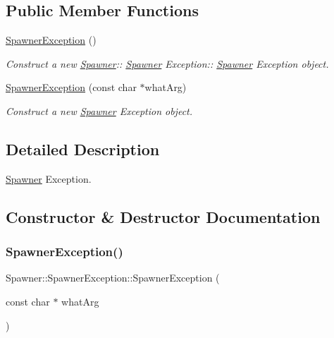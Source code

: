 \subsection*{Public Member Functions}
\begin{DoxyCompactItemize}
\item 
\mbox{\label{class_spawner_1_1_spawner_exception_ae316f8e634adf86867c287e80e40b853}} 
\hyperlink{class_spawner_1_1_spawner_exception_ae316f8e634adf86867c287e80e40b853}{Spawner\+Exception} ()
\begin{DoxyCompactList}\small\item\em Construct a new \hyperlink{class_spawner}{Spawner}\+:\+: \hyperlink{class_spawner}{Spawner} Exception\+:\+: \hyperlink{class_spawner}{Spawner} Exception object. \end{DoxyCompactList}\item 
\hyperlink{class_spawner_1_1_spawner_exception_a2d05238390949da15668a4ef373fc9b2}{Spawner\+Exception} (const char $\ast$what\+Arg)
\begin{DoxyCompactList}\small\item\em Construct a new \hyperlink{class_spawner}{Spawner} Exception object. \end{DoxyCompactList}\end{DoxyCompactItemize}


\subsection{Detailed Description}
\hyperlink{class_spawner}{Spawner} Exception. 

\subsection{Constructor \& Destructor Documentation}
\mbox{\label{class_spawner_1_1_spawner_exception_a2d05238390949da15668a4ef373fc9b2}} 
\subsubsection{\texorpdfstring{Spawner\+Exception()}{SpawnerException()}}
{\footnotesize\ttfamily Spawner\+::\+Spawner\+Exception\+::\+Spawner\+Exception (\begin{DoxyParamCaption}\item[{const char $\ast$}]{what\+Arg }\end{DoxyParamCaption})\hspace{0.3cm}{\ttfamily [explicit]}}



